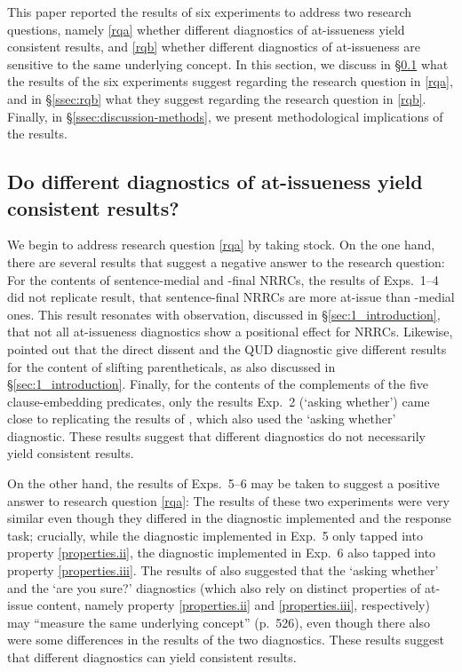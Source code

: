 \documentclass[times,linguex]{glossa}
\begin{document}
This paper reported the results of six experiments to address two research questions, namely \ref{rqa} whether different diagnostics of at-issueness yield consistent results, and \ref{rqb} whether different diagnostics of at-issueness are sensitive to the same underlying concept. In this section, we discuss in \S\ref{ssec:rqa} what the results of the six experiments suggest regarding the research question in \ref{rqa}, and in \S\ref{ssec:rqb} what they suggest regarding the research question in \ref{rqb}. Finally, in \S\ref{ssec:discussion-methods}, we present methodological implications of the results. 

\subsection{Do different diagnostics of at-issueness yield consistent results?}\label{ssec:rqa}

We begin to address research question \ref{rqa} by taking stock. On the one hand, there are several results that suggest a negative answer to the research question: For the contents of sentence-medial and -final NRRCs, the results of Exps.~1--4 did not replicate  result, that sentence-final NRRCs are more at-issue than -medial ones. This result resonates with  observation, discussed in \S\ref{sec:1_introduction}, that not all at-issueness diagnostics show a positional effect for NRRCs. Likewise, \citealt{koev_notions_2018} pointed out that the direct dissent and the QUD diagnostic give different results for the content of slifting parentheticals, as also discussed in \S\ref{sec:1_introduction}. Finally, for the contents of the complements of the five clause-embedding predicates, only the results Exp.~2 (`asking whether') came close to replicating the results of \citealt{degen_projection_2025}, which also used the `asking whether' diagnostic. These results suggest that different diagnostics do not necessarily yield consistent results.

On the other hand, the results of Exps.~5--6 may be taken to suggest a positive answer to research question \ref{rqa}: The results of these two experiments were very similar even though they differed in the diagnostic implemented and the response task; crucially, while the diagnostic implemented in Exp.~5 only tapped into property \ref{properties.ii}, the diagnostic implemented in Exp.~6 also tapped into property \ref{properties.iii}. The results of \citealt{tonhauser_how_2018} also suggested that the `asking whether' and the `are you sure?' diagnostics (which also rely on distinct properties of at-issue content, namely property \ref{properties.ii} and \ref{properties.iii}, respectively) may ``measure the same underlying concept'' (p.~526), even though there also were some differences in the results of the two diagnostics. These results suggest that different diagnostics can yield consistent results. 
\end{document}
